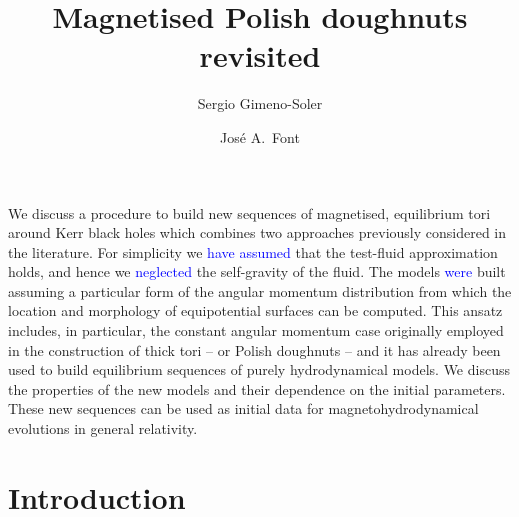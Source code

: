 \documentclass{aa}
\newcommand{\sg}[1]{\textcolor{blue}{#1}}
\begin{document}
 

\title{Magnetised Polish doughnuts revisited}

\author{Sergio Gimeno-Soler   \and Jos\'e A.~Font }

   \date{}
 
  \abstract
{We discuss a procedure to build new sequences of magnetised, equilibrium tori around Kerr black holes which combines two approaches previously considered in the literature. For simplicity we \sg{have assumed} that the test-fluid approximation holds, and hence we \sg{neglected} the self-gravity of the fluid. The models \sg{were} built assuming a particular form of the angular momentum distribution from which the location and morphology of equipotential surfaces can be computed. This ansatz includes, in particular, the  constant angular momentum case originally employed in the construction of thick tori -- or Polish doughnuts -- and it has already been used to build equilibrium sequences of purely hydrodynamical models. We discuss the properties of the new models and their dependence on the initial parameters. These new sequences can be used as initial data for magnetohydrodynamical evolutions in general relativity.}


   \maketitle

\section{Introduction}
\end{document}
